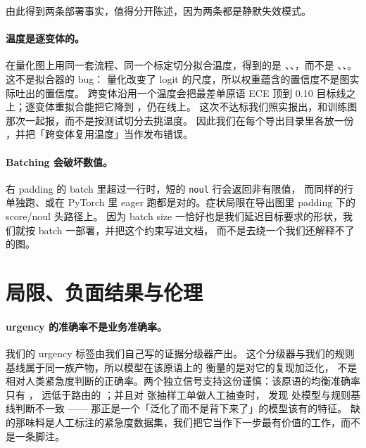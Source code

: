 \documentclass[11pt,a4paper]{article}
\begin{document}
由此得到两条部署事实，值得分开陈述，因为两条都是静默失效模式。

\paragraph{温度是逐变体的。} 在量化图上用同一套流程、同一个标定切分拟合温度，得到的是
\TChoiceOnnx{}、\TScoreOnnx{}、\TNoulOnnx{}，而不是 \TChoice{}、\TScore{}、\TNoul{}。这不是拟合器的 bug：
量化改变了 logit 的尺度，所以权重蕴含的置信度不是图实际吐出的置信度。
跨变体沿用一个温度会把最差单原语 ECE 顶到 \num{0.10} 目标线之上；逐变体重拟合能把它降到 \EceWorstOnnx{}，仍在线上。
这次不达标我们照实报出，和训练图那次一起报，而不是按测试切分去挑温度。
因此我们在每个导出目录里各放一份 ，并把「跨变体复用温度」当作发布错误。

\paragraph{Batching 会破坏数值。} 右 padding 的 batch 里超过一行时，短的 \texttt{noul} 行会返回非有限值，
而同样的行单独跑、或在 PyTorch 里 eager 跑都是对的。症状局限在导出图里 padding 下的 score/noul 头路径上。
因为 batch size 一恰好也是我们延迟目标要求的形状，我们就按 batch 一部署，并把这个约束写进文档，
而不是去绕一个我们还解释不了的图。

\section{局限、负面结果与伦理}

\paragraph{urgency 的准确率不是业务准确率。} 我们的 urgency 标签由我们自己写的证据分级器产出。
这个分级器与我们的规则基线属于同一族产物，所以模型在该原语上的 \AccScore{} 衡量的是对它的复现加泛化，
不是相对人类紧急度判断的正确率。两个独立信号支持这份谨慎：该原语的均衡准确率只有 \BAccScore{}，
远低于路由的 \BAccChoice{}；并且对 \SelfCheckN{} 张抽样工单做人工抽查时，
发现 \SelfCheckDisagree{} 处模型与规则基线判断不一致 —— 那正是一个「泛化了而不是背下来了」的模型该有的特征。
缺的那味料是人工标注的紧急度数据集，我们把它当作下一步最有价值的工作，而不是一条脚注。
\end{document}
